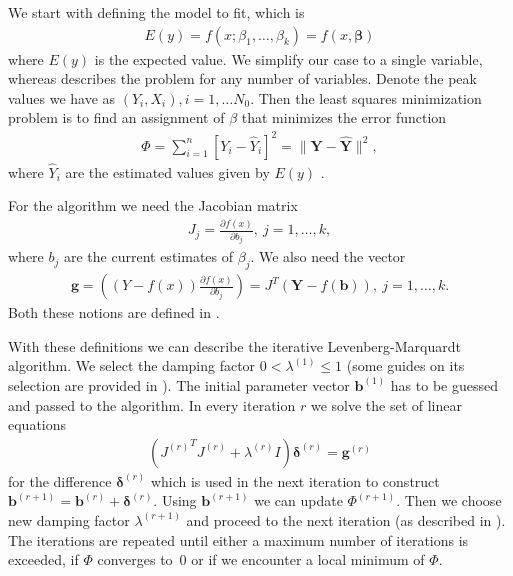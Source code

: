 We start with defining the model to fit, which is 
\begin{align}
E(y) = f(x; \beta_1, \ldots, \beta_k) = f(x, \boldsymbol\beta)
\end{align}
where $E(y)$ is the expected value. We simplify our case to a single variable, whereas \citep[p.~431]{Marquardt1963} describes the problem for any number of variables. Denote the peak values we have as $(Y_i, X_i), i = 1, \ldots N_0$. Then the least squares minimization problem is to find an assignment of $\beta$ that minimizes the error function 
\begin{align}
\Phi = \sum\limits_{i=1}^n[Y_i-\hat{Y}_i]^2 = \|\boldsymbol Y-\hat{\boldsymbol Y}\|^2,
\end{align}
where $\hat{Y}_i$ are the estimated values given by $E(y)$ \citep[p.~431]{Marquardt1963}.

For the algorithm we need the Jacobian matrix 
\begin{align}
J_j = \frac{\partial f(x)}{\partial b_j},\ j = 1, \ldots, k, 
\end{align}
where $b_j$ are the current estimates of $\beta_j$. We also need the vector
\begin{align}
\boldsymbol g = \left( (Y - f(x)) \frac{\partial f(x)}{\partial b_j}\right) = J^T(\boldsymbol Y - f(\boldsymbol b)),\ j = 1, \ldots, k.
\end{align}
Both these notions are defined in \citep[p.~433]{Marquardt1963}.

With these definitions we can describe the iterative Levenberg-Marquardt algorithm. We select the damping factor $0 < \lambda^{(1)} \leq 1$ (some guides on its selection are provided in \citep[p.~437]{Marquardt1963}). The initial parameter vector $\boldsymbol b^{(1)}$ has to be guessed and passed to the algorithm. In every iteration $r$ we solve the set of linear equations
\begin{align}
({J^{(r)}}^T J^{(r)} + \lambda^{(r)}I)\boldsymbol \delta^{(r)} = \boldsymbol g^{(r)}
\end{align}
for the difference $\boldsymbol \delta^{(r)}$ which is used in the next iteration to construct $\boldsymbol b^{(r+1)} = \boldsymbol b^{(r)} + \boldsymbol \delta^{(r)}$. Using $\boldsymbol b^{(r+1)}$ we can update $\Phi^{(r+1)}$. Then we choose new damping factor $\lambda^{(r+1)}$ and proceed to the next iteration (as described in \citep[pp.~437--428]{Marquardt1963}). The iterations are repeated until either a maximum number of iterations is exceeded, if $\Phi$ converges to~0 or if we encounter a local minimum of $\Phi$. 

